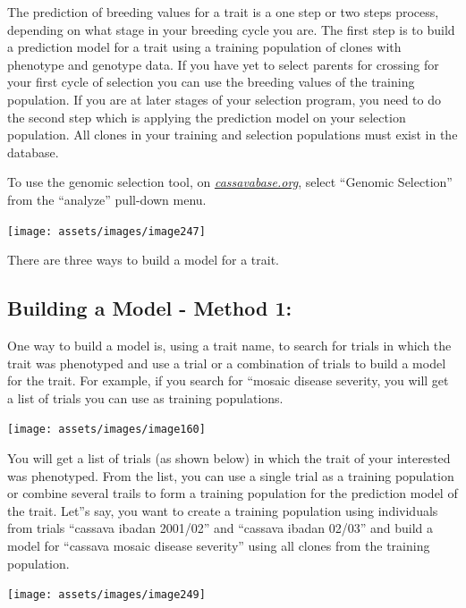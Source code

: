 \documentclass[
  12pt,
]{book}
\begin{document}
The prediction of breeding values for a trait is a one step or two steps process, depending on what stage in your breeding cycle you are. The first step is to build a prediction model for a trait using a training population of clones with phenotype and genotype data. If you have yet to select parents for crossing for your first cycle of selection you can use the breeding values of the training population. If you are at later stages of your selection program, you need to do the second step which is applying the prediction model on your selection population. All clones in your training and selection populations must exist in the database.

To use the genomic selection tool, on \href{http://cassavabase.org/}{\emph{cassavabase.org}}, select ``Genomic Selection'' from the ``analyze'' pull-down menu.

\begin{center}\texttt{[image: assets/images/image247]} \end{center}

There are three ways to build a model for a trait.

\hypertarget{method-1}{%
\subsection{Building a Model - Method 1:}\label{method-1}}

One way to build a model is, using a trait name, to search for trials in which the trait was phenotyped and use a trial or a combination of trials to build a model for the trait. For example, if you search for ``mosaic disease severity, you will get a list of trials you can use as training populations.

\begin{center}\texttt{[image: assets/images/image160]} \end{center}

You will get a list of trials (as shown below) in which the trait of your interested was phenotyped. From the list, you can use a single trial as a training population or combine several trails to form a training population for the prediction model of the trait. Let''s say, you want to create a training population using individuals from trials ``cassava ibadan 2001/02'' and ``cassava ibadan 02/03'' and build a model for ``cassava mosaic disease severity'' using all clones from the training population.

\begin{center}\texttt{[image: assets/images/image249]} \end{center}
\end{document}

